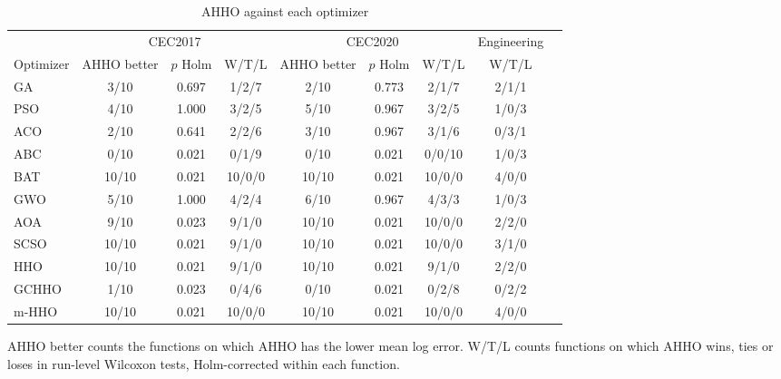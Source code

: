 \begin{table}[htbp]
\caption{AHHO against each optimizer}\label{tab:vs}
\centering
\small
\begin{tabular}{lcccccccc}
\toprule
 & \multicolumn{3}{c}{CEC2017} & \multicolumn{3}{c}{CEC2020} & Engineering \\
\cmidrule(lr){2-4}\cmidrule(lr){5-7}\cmidrule(lr){8-8}
Optimizer & AHHO better & $p$ Holm & W/T/L & AHHO better & $p$ Holm & W/T/L & W/T/L \\
\midrule
GA & 3/10 & 0.697 & 1/2/7 & 2/10 & 0.773 & 2/1/7 & 2/1/1 \\
PSO & 4/10 & 1.000 & 3/2/5 & 5/10 & 0.967 & 3/2/5 & 1/0/3 \\
ACO & 2/10 & 0.641 & 2/2/6 & 3/10 & 0.967 & 3/1/6 & 0/3/1 \\
ABC & 0/10 & 0.021 & 0/1/9 & 0/10 & 0.021 & 0/0/10 & 1/0/3 \\
BAT & 10/10 & 0.021 & 10/0/0 & 10/10 & 0.021 & 10/0/0 & 4/0/0 \\
GWO & 5/10 & 1.000 & 4/2/4 & 6/10 & 0.967 & 4/3/3 & 1/0/3 \\
AOA & 9/10 & 0.023 & 9/1/0 & 10/10 & 0.021 & 10/0/0 & 2/2/0 \\
SCSO & 10/10 & 0.021 & 9/1/0 & 10/10 & 0.021 & 10/0/0 & 3/1/0 \\
HHO & 10/10 & 0.021 & 9/1/0 & 10/10 & 0.021 & 9/1/0 & 2/2/0 \\
GCHHO & 1/10 & 0.023 & 0/4/6 & 0/10 & 0.021 & 0/2/8 & 0/2/2 \\
m-HHO & 10/10 & 0.021 & 10/0/0 & 10/10 & 0.021 & 10/0/0 & 4/0/0 \\
\bottomrule
\end{tabular}
\vspace{2pt}

{\small AHHO better counts the functions on which AHHO has the lower mean log error. W/T/L counts functions on which AHHO wins, ties or loses in run-level Wilcoxon tests, Holm-corrected within each function.}
\end{table}

